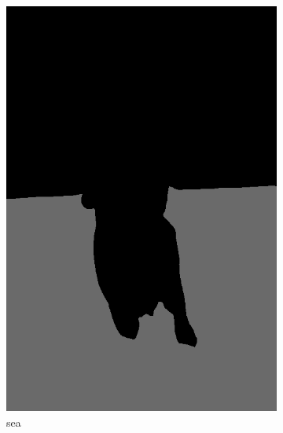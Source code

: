 \documentclass[11pt]{article}
\begin{document}
\begin{figure}[h]
\begin{subfigure}[b]{0.25\textwidth}
         \includegraphics[width=\textwidth]{sea.png}
         \caption{sea}
         \label{fig:three sin x}
     \end{subfigure}
     \begin{subfigure}[b]{0.25\textwidth}
         \centering

\end{subfigure}
\end{figure}
\end{document}

